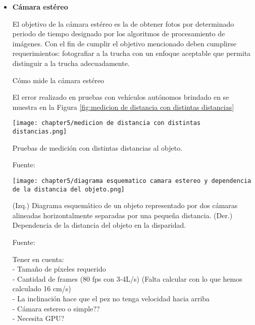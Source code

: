 \begin{itemize}
	\item \textbf{Cámara estéreo}
	
	El objetivo de la cámara estéreo es la de obtener fotos por determinado periodo de tiempo designado por los algoritmos de procesamiento de imágenes. Con el fin de cumplir el objetivo mencionado deben cumplirse requerimientos: fotografiar a la trucha con un enfoque aceptable que permita distinguir a la trucha adecuadamente.
	
	Cómo mide la cámara estéreo 
	
	El error realizado en pruebas con vehículos autónomos brindado en \cite{Zaarane2020} se muestra en la Figura \ref{fig:medicion de distancia con distintas distancias}
	
	\begin{myfigure}[H]
		\centering
		\texttt{[image: chapter5/medicion de distancia con distintas distancias.png]}
		\caption{Pruebas de medición con distintas distancias al objeto.}
		\begin{myflushleftportland}
			Fuente: \cite{Zaarane2020}
		\end{myflushleftportland}
		\label{fig:medicion de distancia con distintas distancias}
	\end{myfigure}
	
	
	\begin{myfigure}[H]
		\centering
		\texttt{[image: chapter5/diagrama esquematico camara estereo y dependencia de la distancia del objeto.png]}
		\caption[Diagrama esquemático y dependencia de la distancia del objeto seguido por una cámara estéreo.]{(Izq.) Diagrama esquemático de un objeto representado por dos cámaras alineadas horizontalmente separadas por una pequeña distancia. (Der.) Dependencia de la distancia del objeto en la disparidad.}
		\begin{myflushleftportland}
			Fuente: \cite{Mahammed2013}
		\end{myflushleftportland}
		\label{fig:diagrama esquematico camara estereo y dependencia de la distancia del objeto}
	\end{myfigure}
	
	
	Tener en cuenta: \\
	- Tamaño de píxeles requerido \\
	- Cantidad de frames (80 fps con 3-4L/s) (Falta calcular con lo que hemos calculado 16 cm/s) \\ 
	- La inclinación hace que el pez no tenga velocidad hacia arriba \\
	- Cámara estereo o simple?? \\
	- Necesita GPU? \\
	

\end{itemize}

